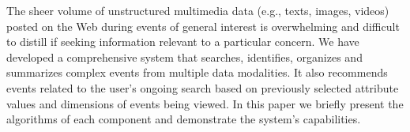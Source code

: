 The sheer volume of unstructured multimedia data (e.g., texts, images, videos) posted on the Web during events of general interest is overwhelming and difficult to distill if seeking information relevant to a particular concern. We have developed a comprehensive system that searches, identifies, organizes and summarizes complex events from multiple data modalities. It also recommends events related to the user's ongoing search based on previously selected attribute values and dimensions of events being viewed. In this paper we briefly present the algorithms of each component and demonstrate the system's capabilities.
